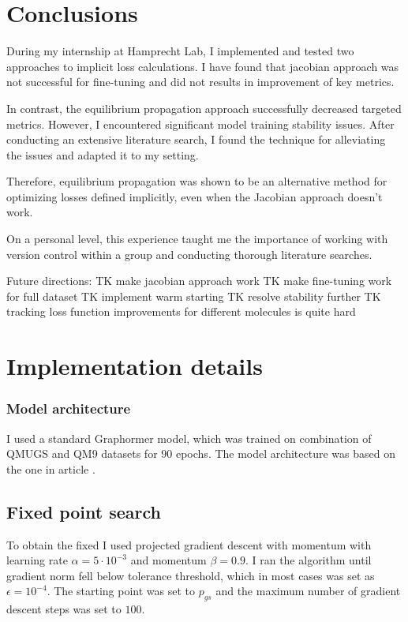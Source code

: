 \documentclass[a4paper,10pt]{report}
\begin{document}
\clearpage
\section{Conclusions}
During my internship at Hamprecht Lab, I implemented and tested two approaches to implicit loss calculations. I have found that jacobian approach was not successful for fine-tuning and did not results in improvement of key metrics.

In contrast, the equilibrium propagation approach successfully decreased targeted metrics. However, I encountered significant model training stability issues. After conducting an extensive literature search, I found the technique for alleviating the issues and adapted it to my setting.

Therefore, equilibrium propagation was shown to be an alternative method for optimizing losses defined implicitly, even when the Jacobian approach doesn't work.

On a personal level, this experience taught me the importance of working with version control within a group and conducting thorough literature searches.

Future directions:
TK make jacobian approach work
TK make fine-tuning work for full dataset
TK implement warm starting
TK resolve stability further
TK tracking loss function improvements for different molecules is quite hard
\nocite{*}





\appendix
\section{Implementation details} \label{sec:impl}

\subsubsection{Model architecture}
I used a standard Graphormer model, which was trained on combination of QMUGS and QM9 datasets for $90$ epochs. The model architecture was based on the one in article \cite{zhang2024overcoming}.

\subsection{Fixed point search}
To obtain the fixed I used projected gradient descent with momentum with learning rate $\alpha = 5\cdot 10^{-3}$ and momentum $\beta = 0.9$. I ran the algorithm until gradient norm fell below tolerance threshold, which in most cases was set as $\epsilon = 10^{-4}$. The starting point was set to $p_{gs}$ and the maximum number of gradient descent steps was set to $100$.
\end{document}
